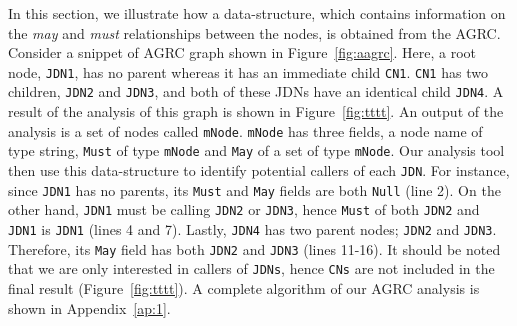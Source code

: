 In this section, we illustrate how a data-structure, which contains
information on the \textit{may} and \textit{must} relationships between
the nodes, is obtained from the AGRC. Consider a snippet of AGRC graph
shown in Figure~\ref{fig:aagrc}. Here, a root node, \texttt{JDN1}, has
no parent whereas it has an immediate child \texttt{CN1}. \texttt{CN1}
has two children, \texttt{JDN2} and \texttt{JDN3}, and both of these
JDNs have an identical child \texttt{JDN4}. A result of the analysis of
this graph is shown in Figure~\ref{fig:tttt}. An output of the analysis
is a set of nodes called \texttt{mNode}. \texttt{mNode} has three
fields, a node name of type string, \texttt{Must} of type \texttt{mNode}
and \texttt{May} of a set of type \texttt{mNode}. Our analysis tool then
use this data-structure to identify potential callers of each
\texttt{JDN}. For instance, since \texttt{JDN1} has no parents, its
\texttt{Must} and \texttt{May} fields are both \texttt{Null} (line 2).
On the other hand, \texttt{JDN1} must be calling \texttt{JDN2} or
\texttt{JDN3}, hence \texttt{Must} of both \texttt{JDN2} and
\texttt{JDN1} is \texttt{JDN1} (lines 4 and 7). Lastly, \texttt{JDN4}
has two parent nodes; \texttt{JDN2} and \texttt{JDN3}. Therefore, its
\texttt{May} field has both \texttt{JDN2} and \texttt{JDN3} (lines
11-16). It should be noted that we are only interested in callers of
\texttt{JDNs}, hence \texttt{CNs} are not included in the final result
(Figure~\ref{fig:tttt}). A complete algorithm of our AGRC analysis is
shown in Appendix~\ref{ap:1}.






